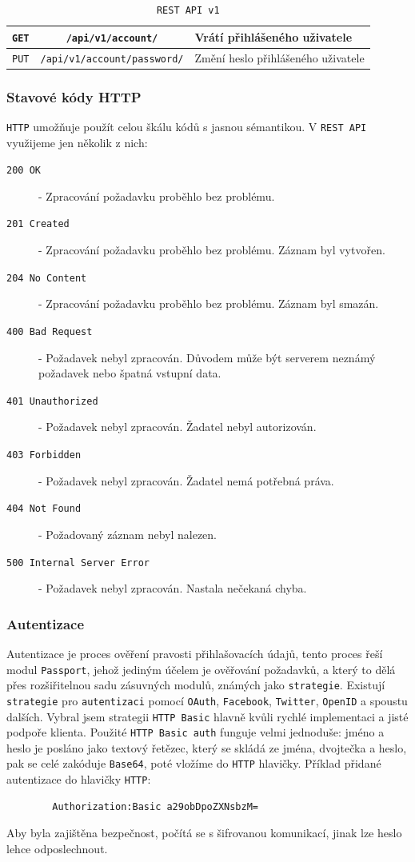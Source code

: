 \documentclass[czech,BP]{thesiskiv}
\begin{document}
\begin{table}[H]
\begin{tabular}{ c | c | p{6cm}}
\texttt{GET} & \texttt{/api/v1/account/} & Vrátí přihlášeného uživatele  \\ \hline
\texttt{PUT} & \texttt{/api/v1/account/password/} & Změní heslo přihlášeného uživatele \\ \hline    
\end{tabular}
\caption{\texttt{REST API v1}}
\label{table:api}
\end{table}

			\subsubsection{Stavové kódy HTTP}
			\texttt{HTTP} umožňuje použít celou škálu kódů s jasnou sémantikou. V \texttt{REST API} využijeme jen několik z nich:
\begin{description}
\item [\texttt{200 OK}] - Zpracování požadavku proběhlo bez problému.
\item [\texttt{201 Created}] - Zpracování požadavku proběhlo bez problému. Záznam byl vytvořen. 
\item [\texttt{204 No Content}] - Zpracování požadavku proběhlo bez problému. Záznam byl smazán.
\item [\texttt{400 Bad Request}] - Požadavek nebyl zpracován. Důvodem může být serverem neznámý požadavek nebo špatná vstupní data.
\item [\texttt{401 Unauthorized}] - Požadavek nebyl zpracován. Žadatel nebyl autorizován.
\item [\texttt{403 Forbidden}] - Požadavek nebyl zpracován. Žadatel nemá potřebná práva.
\item [\texttt{404 Not Found}] - Požadovaný záznam nebyl nalezen.
\item [\texttt{500 Internal Server Error}] - Požadavek nebyl zpracován. Nastala nečekaná chyba.
\end{description}

	\subsubsection{Autentizace}
		Autentizace je proces ověření pravosti přihlašovacích údajů, tento proces řeší modul \texttt{Passport}, jehož jediným účelem je ověřování požadavků, a který to dělá přes rozšiřitelnou sadu zásuvných modulů, známých jako \texttt{strategie}. 
		Existují \texttt{strategie} pro \texttt{autentizaci} pomocí \texttt{OAuth}, \texttt{Facebook}, \texttt{Twitter}, \texttt{OpenID} a spoustu dalších.		
		Vybral jsem strategii \texttt{HTTP Basic} hlavně kvůli rychlé implementaci a jisté podpoře klienta.
		Použité \texttt{HTTP Basic auth} funguje velmi jednoduše: jméno a heslo je posláno jako textový řetězec, který se skládá ze jména, dvojtečka a heslo, pak se celé zakóduje \texttt{Base64}, poté vložíme do \texttt{HTTP} hlavičky.
Příklad přidané autentizace do hlavičky \texttt{HTTP}:
\begin{verbatim}
		Authorization:Basic a29obDpoZXNsbzM=
\end{verbatim}
Aby byla zajištěna bezpečnost, počítá se s šifrovanou komunikací, jinak lze heslo lehce odposlechnout.
\end{document}
